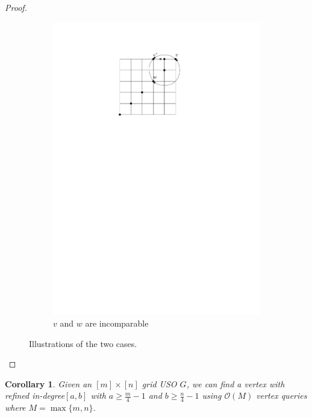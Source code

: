 \documentclass[a4paper,10pt]{article}
\newtheorem{corollary}{Corollary}
\newcommand{\indegree}{refined in-degree\xspace}
\begin{document}
\begin{proof}
\begin{figure}[htbp]
\begin{subfigure}[b]{0.4\textwidth}
           \includegraphics[scale = 0.7]{seedlemma_fig2_cas2.pdf}
           \caption{$v$ and $w$ are incomparable}
       \end{subfigure}
       \caption{Illustrations of the two cases. }
       \label{fig:seedlem2}
   \end{figure}
\end{proof}

\begin{corollary}\label{corollary: n/4 indegree}
  Given an $[m]\times [n]$ grid USO $G$, we can find a vertex with \indegree $[a,b]$ with $a \geq \frac{m}{4} - 1$ and  $b \geq \frac{n}{4} - 1$ using $\mathcal{O}(M)$ vertex queries where $M = \max\{m,n\}$.
\end{corollary}
\end{document}
